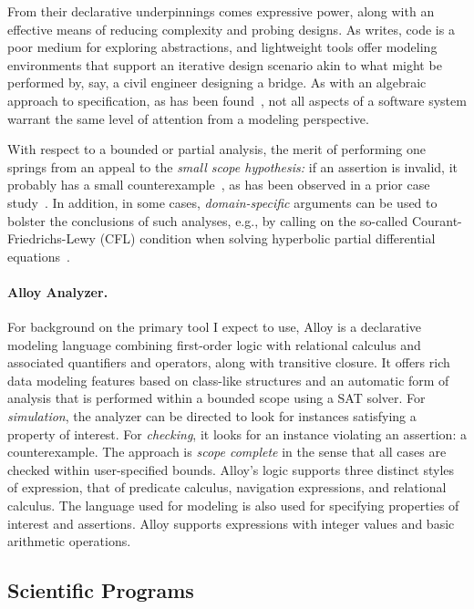 \documentclass[12pt]{article}
\begin{document}
From their declarative underpinnings comes expressive power, along
with an effective means of reducing complexity and probing designs.
As \cite{jackson2012} writes, code is a poor medium for exploring
abstractions, and lightweight tools offer modeling environments that
support an iterative design scenario akin to what might be performed
by, say, a civil engineer designing a bridge.  As with an algebraic
approach to specification, as has been found~\citep{baugh1992b}, not
all aspects of a software system warrant the same level of attention
from a modeling perspective.

With respect to a bounded or partial analysis, the merit of performing
one springs from an appeal to the \emph{small scope hypothesis:} if an
assertion is invalid, it probably has a small
counterexample~\citep{jackson1996}, as has been observed in a prior
case study~\citep{baugh2017}.  In addition, in some cases,
\emph{domain-specific} arguments can be used to bolster the
conclusions of such analyses, e.g., by calling on the so-called
Courant-Friedrichs-Lewy (CFL) condition when solving hyperbolic
partial differential equations~\citep{baugh2017,altuntas2017asm}.

\paragraph{Alloy Analyzer.} For background on the primary tool
I expect to use, Alloy is a declarative modeling language combining
first-order logic with relational calculus and associated quantifiers
and operators, along with transitive closure.  It offers rich data
modeling features based on class-like structures and an automatic form
of analysis that is performed within a bounded scope using a SAT
solver.  For \emph{simulation}, the analyzer can be directed to look
for instances satisfying a property of interest.  For
\emph{checking}, it looks for an instance violating an assertion: a
counterexample.  The approach is \emph{scope complete} in the sense
that all cases are checked within user-specified bounds.  Alloy's
logic supports three distinct styles of expression, that of predicate
calculus, navigation expressions, and relational calculus.  The
language used for modeling is also used for specifying properties of
interest and assertions.  Alloy supports expressions with integer
values and basic arithmetic operations.

\subsection{Scientific Programs}
\end{document}
